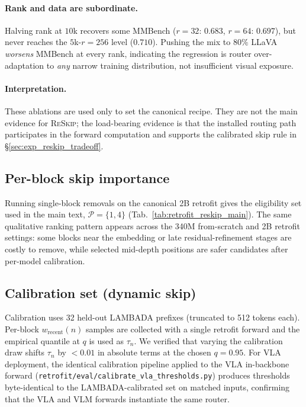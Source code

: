 \documentclass{article}
\newcommand{\reskip}{\textsc{ReSkip}}
\begin{document}
\paragraph{Rank and data are subordinate.} Halving rank at $10$k recovers some MMBench ($r{=}32$: $0.683$, $r{=}64$: $0.697$), but never reaches the $5$k-$r{=}256$ level ($0.710$). Pushing the mix to $80\%$ LLaVA \emph{worsens} MMBench at every rank, indicating the regression is router over-adaptation to \emph{any} narrow training distribution, not insufficient visual exposure.

\paragraph{Interpretation.} These ablations are used only to set the canonical recipe. They are not the main evidence for \reskip{}; the load-bearing evidence is that the installed routing path participates in the forward computation and supports the calibrated skip rule in \S\ref{sec:exp_reskip_tradeoff}.

\subsection{Per-block skip importance}
\label{app:block_removal}
Running single-block removals on the canonical 2B retrofit gives the eligibility set used in the main text, $\mathcal{P}{=}\{1,4\}$ (Tab.~\ref{tab:retrofit_reskip_main}). The same qualitative ranking pattern appears across the 340M from-scratch and 2B retrofit settings: some blocks near the embedding or late residual-refinement stages are costly to remove, while selected mid-depth positions are safer candidates after per-model calibration.

\subsection{Calibration set (dynamic skip)}
\label{app:calibration}
Calibration uses 32 held-out LAMBADA prefixes (truncated to 512 tokens each). Per-block $w_{\text{recent}}(n)$ samples are collected with a single retrofit forward and the empirical quantile at $q$ is used as $\tau_n$. We verified that varying the calibration draw shifts $\tau_n$ by $<0.01$ in absolute terms at the chosen $q{=}0.95$. For VLA deployment, the identical calibration pipeline applied to the VLA in-backbone forward (\texttt{retrofit/eval/calibrate\_vla\_thresholds.py}) produces thresholds byte-identical to the LAMBADA-calibrated set on matched inputs, confirming that the VLA and VLM forwards instantiate the same router.
\end{document}
